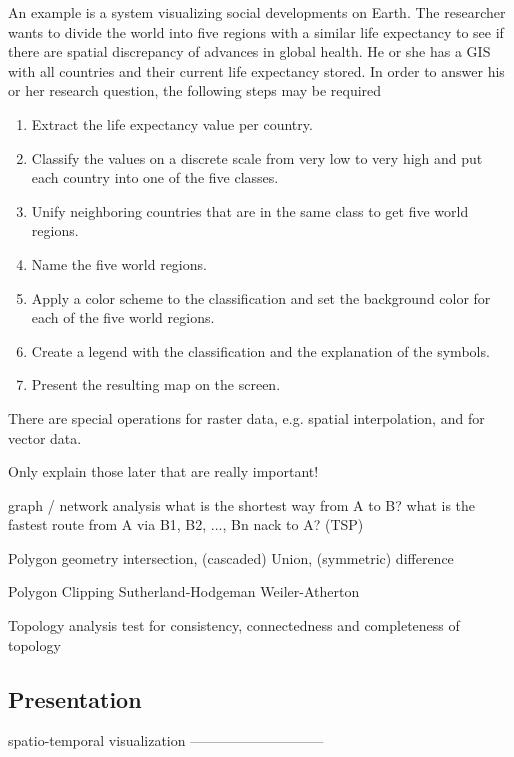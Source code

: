 An example is a system visualizing social developments on Earth. The researcher wants to divide the world into five regions with a similar life expectancy to see if there are spatial discrepancy of advances in global health. He or she has a GIS with all countries and their current life expectancy stored. In order to answer his or her research question, the following steps may be required

\begin{enumerate}
  \item Extract the life expectancy value per country.
  \item Classify the values on a discrete scale from very low to very high and put each country into one of the five classes.
  \item Unify neighboring countries that are in the same class to get five world regions.
  \item Name the five world regions.
  \item Apply a color scheme to the classification and set the background color for each of the five world regions.
  \item Create a legend with the classification and the explanation of the symbols.
  \item Present the resulting map on the screen.
\end{enumerate}

There are special operations for raster data, e.g. spatial interpolation, and for vector data.

Only explain those later that are really important!

graph / network analysis
  what is the shortest way from A to B?
  what is the fastest route from A via B1, B2, ..., Bn nack to A? (TSP)

Polygon geometry
  intersection, (cascaded) Union, (symmetric) difference

Polygon Clipping
  Sutherland-Hodgeman
  Weiler-Atherton

Topology analysis
  test for consistency, connectedness and completeness of topology


\subsection{Presentation} %
\label{sub:presentation}

spatio-temporal visualization
-----------------------------

